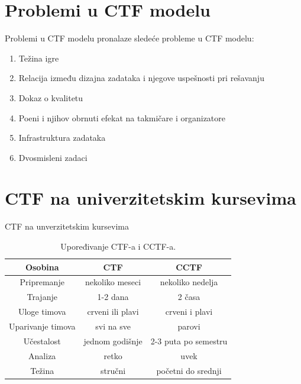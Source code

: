 \documentclass[aspectratio=169,xcolor=dvipsnames]{beamer}
\begin{document}
\section{Problemi u CTF modelu}

\begin{frame}{Problemi u CTF modelu}
    \cite{ctfchung} pronalaze sledeće probleme u CTF modelu:
    \begin{enumerate}
        \item Težina igre
        \item Relacija između dizajna zadataka i njegove uspešnosti pri
            rešavanju
        \item Dokaz o kvalitetu
        \item Poeni i njihov obrnuti efekat na takmičare i organizatore
        \item Infrastruktura zadataka
        \item Dvosmisleni zadaci
    \end{enumerate}
\end{frame}

\section{CTF na univerzitetskim kursevima}

\begin{frame}{CTF na unverzitetskim kursevima}
    \begin{table}[!h]
        \centering
        \begin{tabular}{|c|c|c|}
            \hline
            \textbf{Osobina} & \textbf{CTF} & \textbf{CCTF} \\
            \hline
            \hline
            Pripremanje & nekoliko meseci & nekoliko nedelja \\
            Trajanje & 1-2 dana & 2 časa \\
            Uloge timova & crveni ili plavi & crveni i plavi \\
            Uparivanje timova & svi na sve & parovi \\
            Učestalost & jednom godišnje & 2-3 puta po semestru \\
            Analiza & retko & uvek \\
            Težina & stručni & početni do srednji \\
            \hline
        \end{tabular}
        \caption{Upoređivanje CTF-a i CCTF-a.\cite{ctfclass}}\label{tab:cctf}
    \end{table}
\end{frame}
\end{document}
